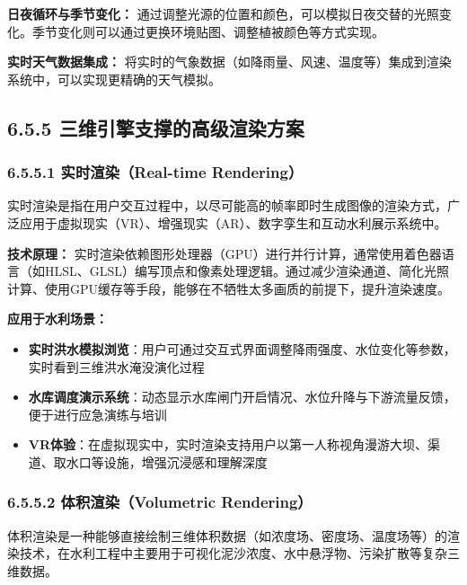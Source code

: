 \textbf{日夜循环与季节变化：}
通过调整光源的位置和颜色，可以模拟日夜交替的光照变化。季节变化则可以通过更换环境贴图、调整植被颜色等方式实现。

\textbf{实时天气数据集成：}
将实时的气象数据（如降雨量、风速、温度等）集成到渲染系统中，可以实现更精确的天气模拟。

\subsection{6.5.5
三维引擎支撑的高级渲染方案}\label{ux4e09ux7ef4ux5f15ux64ceux652fux6491ux7684ux9ad8ux7ea7ux6e32ux67d3ux65b9ux6848}

\subsubsection{6.5.5.1 实时渲染（Real-time
Rendering）}\label{ux5b9eux65f6ux6e32ux67d3real-time-rendering}

实时渲染是指在用户交互过程中，以尽可能高的帧率即时生成图像的渲染方式，广泛应用于虚拟现实（VR）、增强现实（AR）、数字孪生和互动水利展示系统中。

\textbf{技术原理：}
实时渲染依赖图形处理器（GPU）进行并行计算，通常使用着色器语言（如HLSL、GLSL）编写顶点和像素处理逻辑。通过减少渲染通道、简化光照计算、使用GPU缓存等手段，能够在不牺牲太多画质的前提下，提升渲染速度。

\textbf{应用于水利场景：}

\begin{itemize}
\tightlist
\item
  \textbf{实时洪水模拟浏览}：用户可通过交互式界面调整降雨强度、水位变化等参数，实时看到三维洪水淹没演化过程
\item
  \textbf{水库调度演示系统}：动态显示水库闸门开启情况、水位升降与下游流量反馈，便于进行应急演练与培训
\item
  \textbf{VR体验}：在虚拟现实中，实时渲染支持用户以第一人称视角漫游大坝、渠道、取水口等设施，增强沉浸感和理解深度
\end{itemize}

\subsubsection{6.5.5.2 体积渲染（Volumetric
Rendering）}\label{ux4f53ux79efux6e32ux67d3volumetric-rendering}

体积渲染是一种能够直接绘制三维体积数据（如浓度场、密度场、温度场等）的渲染技术，在水利工程中主要用于可视化泥沙浓度、水中悬浮物、污染扩散等复杂三维数据。

